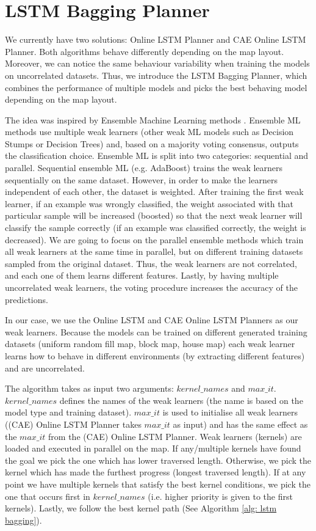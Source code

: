 \pagebreak

\section{LSTM Bagging Planner}

We currently have two solutions: Online LSTM Planner and CAE Online LSTM Planner. Both algorithms behave differently depending on the map layout. Moreover, we can notice the same behaviour variability when training the models on uncorrelated datasets. Thus, we introduce the LSTM Bagging Planner, which combines the performance of multiple models and picks the best behaving model depending on the map layout.

The idea was inspired by Ensemble Machine Learning methods \cite{dietterich2000ensemble}. Ensemble ML methods use multiple weak learners (other weak ML models such as Decision Stumps or Decision Trees) and, based on a majority voting consensus, outputs the classification choice. Ensemble ML is split into two categories: sequential and parallel. Sequential ensemble ML (e.g. AdaBoost) trains the weak learners sequentially on the same dataset. However, in order to make the learners independent of each other, the dataset is weighted. After training the first weak learner, if an example was wrongly classified, the weight associated with that particular sample will be increased (boosted) so that the next weak learner will classify the sample correctly (if an example was classified correctly, the weight is decreased). We are going to focus on the parallel ensemble methods which train all weak learners at the same time in parallel, but on different training datasets sampled from the original dataset. Thus, the weak learners are not correlated, and each one of them learns different features. Lastly, by having multiple uncorrelated weak learners, the voting procedure increases the accuracy of the predictions.

In our case, we use the Online LSTM and CAE Online LSTM Planners as our weak learners. Because the models can be trained on different generated training datasets (uniform random fill map, block map, house map) each weak learner learns how to behave in different environments (by extracting different features) and are uncorrelated.

The algorithm takes as input two arguments: $kernel\_names$ and $max\_it$. $kernel\_names$ defines the names of the weak learners (the name is based on the model type and training dataset). $max\_it$ is used to initialise all weak learners ((CAE) Online LSTM Planner takes $max\_it$ as input) and has the same effect as the $max\_it$ from the (CAE) Online LSTM Planner. Weak learners (kernels) are loaded and executed in parallel on the map. If any/multiple kernels have found the goal we pick the one which has lower traversed length. Otherwise, we pick the kernel which has made the furthest progress (longest traversed length). If at any point we have multiple kernels that satisfy the best kernel conditions, we pick the one that occurs first in $kernel\_names$ (i.e. higher priority is given to the first kernels). Lastly, we follow the best kernel path (See Algorithm \ref{alg: lstm bagging}).

